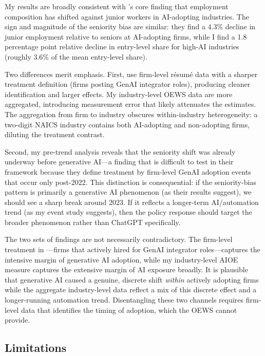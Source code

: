 \documentclass[12pt]{article}
\begin{document}
My results are broadly consistent with \citet{hosseini2025}'s core finding that employment composition has shifted against junior workers in AI-adopting industries. The sign and magnitude of the seniority bias are similar: they find a 4.3\% decline in junior employment relative to seniors at AI-adopting firms, while I find a 1.8 percentage point relative decline in entry-level share for high-AI industries (roughly 3.6\% of the mean entry-level share).

Two differences merit emphasis. First, \citet{hosseini2025} use firm-level r\'{e}sum\'{e} data with a sharper treatment definition (firms posting GenAI integrator roles), producing cleaner identification and larger effects. My industry-level OEWS data are more aggregated, introducing measurement error that likely attenuates the estimates. The aggregation from firm to industry obscures within-industry heterogeneity: a two-digit NAICS industry contains both AI-adopting and non-adopting firms, diluting the treatment contrast.

Second, my pre-trend analysis reveals that the seniority shift was already underway before generative AI---a finding that is difficult to test in their framework because they define treatment by firm-level GenAI adoption events that occur only post-2022. This distinction is consequential: if the seniority-bias pattern is primarily a generative AI phenomenon (as their results suggest), we should see a sharp break around 2023. If it reflects a longer-term AI/automation trend (as my event study suggests), then the policy response should target the broader phenomenon rather than ChatGPT specifically.

The two sets of findings are not necessarily contradictory. The firm-level treatment in \citet{hosseini2025}---firms that actively hired for GenAI integrator roles---captures the intensive margin of generative AI adoption, while my industry-level AIOE measure captures the extensive margin of AI exposure broadly. It is plausible that generative AI caused a genuine, discrete shift \emph{within} actively adopting firms while the aggregate industry-level data reflect a mix of this discrete effect and a longer-running automation trend. Disentangling these two channels requires firm-level data that identifies the timing of adoption, which the OEWS cannot provide.

\subsection{Limitations}
\end{document}
